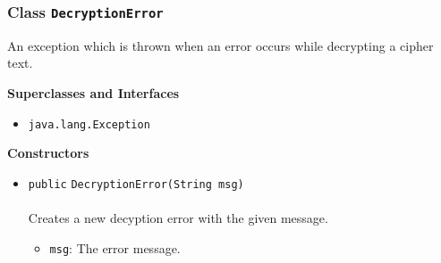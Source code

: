 \subsubsection{Class \lstinline|DecryptionError|}
An exception which is thrown when an error occurs while decrypting a cipher
 text. \\
\noindent\begin{minipage}[t]{5cm}
\vspace{0.3em}
\hspace*{2em}
\vspace{0.3em}
\end{minipage}



\textbf{\sffamily Superclasses and Interfaces}
\begin{itemize}
\item \lstinline|java.lang.Exception|
\end{itemize}


\textbf{\sffamily Constructors}
\begin{itemize}
\item \lstinline|public| \lstinline|DecryptionError|\lstinline|(String msg)|\\ \\[-0.6em]
Creates a new decyption error with the given message.
\begin{itemize}
\item \lstinline|msg|: The error message.
\end{itemize}



\end{itemize}


